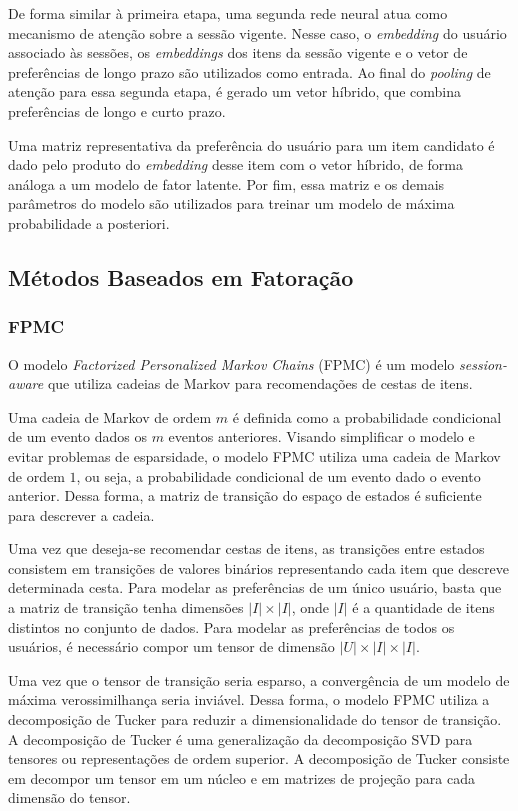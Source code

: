De forma similar à primeira etapa, uma segunda rede neural atua como mecanismo
de atenção sobre a sessão vigente. Nesse caso, o \textit{embedding} do usuário associado
às sessões, os \textit{embeddings} dos itens da sessão vigente e o vetor de
preferências de longo prazo são utilizados como entrada. Ao final do \textit{pooling}
de atenção para essa segunda etapa, é gerado um vetor híbrido, que combina
preferências de longo e curto prazo.

Uma matriz representativa da preferência do usuário para um item candidato é
dado pelo produto do \textit{embedding} desse item com o vetor híbrido, de forma
análoga a um modelo de fator latente. Por fim, essa matriz e os demais
parâmetros do modelo são utilizados para treinar um modelo de máxima
probabilidade a posteriori.

\subsection{Métodos Baseados em Fatoração}

\subsubsection{FPMC}
O modelo \textit{Factorized Personalized Markov Chains} (FPMC) é um modelo \textit{session-aware}
que utiliza cadeias de Markov para recomendações de cestas de itens. \cite{mkv}

Uma cadeia de Markov de ordem $m$ é definida como a probabilidade condicional de
um evento dados os $m$ eventos anteriores. Visando simplificar o modelo e evitar
problemas de esparsidade, o modelo FPMC utiliza uma cadeia de Markov de ordem
$1$, ou seja, a probabilidade condicional de um evento dado o evento anterior.
Dessa forma, a matriz de transição do espaço de estados é suficiente para
descrever a cadeia.

Uma vez que deseja-se recomendar cestas de itens, as transições entre estados
consistem em transições de valores binários representando cada item que descreve
determinada cesta. Para modelar as preferências de um único usuário, basta que a
matriz de transição tenha dimensões $|I| \times |I|$, onde $|I|$ é a quantidade
de itens distintos no conjunto de dados. Para modelar as preferências de todos
os usuários, é necessário compor um tensor de dimensão $|U|
\times |I| \times |I|$.

Uma vez que o tensor de transição seria esparso, a convergência de um modelo de
máxima verossimilhança seria inviável. Dessa forma, o modelo FPMC utiliza a
decomposição de Tucker para reduzir a dimensionalidade do tensor de transição. A
decomposição de Tucker é uma generalização da decomposição SVD para tensores ou
representações de ordem superior. A decomposição de Tucker consiste em decompor
um tensor em um núcleo e em matrizes de projeção para cada dimensão do tensor.

